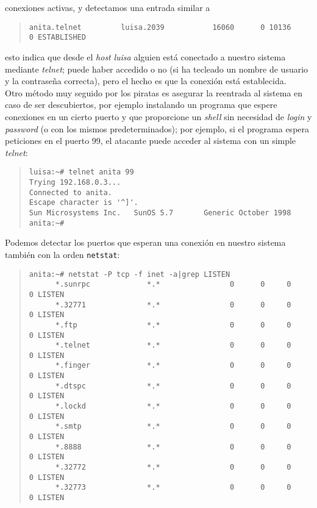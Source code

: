 \begin{itemize}
conexiones activas, y detectamos una entrada similar a
\tt\small
\begin{quote}
\begin{verbatim}
anita.telnet         luisa.2039           16060      0 10136      0 ESTABLISHED
\end{verbatim}
\end{quote}
\rm\normalsize
esto indica que desde el {\it host} {\it luisa} alguien est\'a conectado a
nuestro sistema mediante {\it telnet}; puede haber accedido o no (si ha tecleado
un nombre de usuario y la contrase\~na correcta), pero el hecho es que la
conexi\'on est\'a establecida.\\
Otro m\'etodo muy seguido por los piratas es asegurar la reentrada al sistema
en caso de ser descubiertos, por ejemplo instalando un programa que espere 
conexiones en un cierto puerto y que proporcione un {\it shell} sin necesidad 
de {\it login} y {\it password} (o con los mismos predeterminados); por 
ejemplo, si el programa espera peticiones
en el puerto 99, el atacante puede acceder al sistema con un simple {\it 
telnet}:
\tt
\begin{quote}
\begin{verbatim}
luisa:~# telnet anita 99
Trying 192.168.0.3...
Connected to anita.
Escape character is '^]'.
Sun Microsystems Inc.   SunOS 5.7       Generic October 1998
anita:~#
\end{verbatim}
\end{quote}
\rm
Podemos detectar los puertos que esperan una conexi\'on en nuestro sistema
tambi\'en con la orden {\tt netstat}:
\tt
\small
\begin{quote}
\begin{verbatim}
anita:~# netstat -P tcp -f inet -a|grep LISTEN
      *.sunrpc             *.*                0      0     0      0 LISTEN
      *.32771              *.*                0      0     0      0 LISTEN
      *.ftp                *.*                0      0     0      0 LISTEN
      *.telnet             *.*                0      0     0      0 LISTEN
      *.finger             *.*                0      0     0      0 LISTEN
      *.dtspc              *.*                0      0     0      0 LISTEN
      *.lockd              *.*                0      0     0      0 LISTEN
      *.smtp               *.*                0      0     0      0 LISTEN
      *.8888               *.*                0      0     0      0 LISTEN
      *.32772              *.*                0      0     0      0 LISTEN
      *.32773              *.*                0      0     0      0 LISTEN

\end{verbatim}
\end{quote}
\end{itemize}

